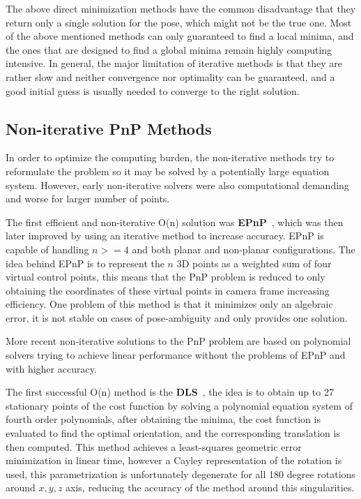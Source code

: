\documentclass[letterpaper, 10 pt, conference]{ieeeconf}  %
\begin{document}
The above direct minimization methods \cite{Oberkampf1996,Lu2000,Garro2012,Schweighofer2008} have the common disadvantage that they return only a single solution for the pose, which might not be the true one. Most of the above mentioned methods can only guaranteed to find a local minima, and the ones that are designed to find a global minima remain highly computing intensive. In general, the major limitation of iterative methods is that they are rather slow and neither convergence nor optimality can be guaranteed, and a good initial guess is usually needed to converge to the right solution.


\subsection{Non-iterative PnP Methods}

In order to optimize the computing burden, the non-iterative methods try to reformulate the problem so it may be solved by a potentially large equation system. However, early non-iterative solvers were also computational demanding and worse for larger number of points.

The first efficient and non-iterative O(n) solution was \textbf{EPnP}~\cite{Lepetit2008}, which was then later improved by using an iterative method to increase accuracy. EPnP is capable of handling $n >= 4$ and both planar and non-planar configurations. The idea behind EPnP is to represent the $n$ 3D points as a weighted sum of four virtual control points, this means that the PnP problem is reduced to only obtaining the coordinates of these virtual points in camera frame increasing efficiency. One problem of this method is that it minimizes only an algebraic error, it is not stable on cases of pose-ambiguity and only provides one solution. %

More recent non-iterative solutions to the PnP problem are based on polynomial solvers trying to achieve linear performance without the problems of EPnP and with higher accuracy. 

The first successful O(n) method is the \textbf{DLS}~\cite{Hesch2011}, the idea is to obtain up to 27 stationary points of the cost function by solving a polynomial equation system of fourth order polynomials, after obtaining the minima, the cost function is evaluated to find the optimal orientation, and the corresponding translation is then computed. This method achieves a least-squares geometric error minimization in linear time, however a Cayley representation of the rotation is used, this parametrization is unfortunately degenerate for all 180 degree rotations around $x,y,z$ axis, reducing the accuracy of the method around this singularities. %
\end{document}
